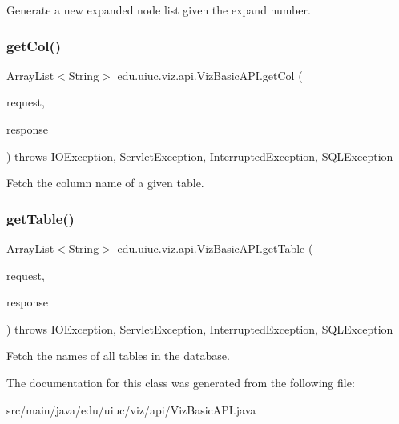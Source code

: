 Generate a new expanded node list given the expand number. \mbox{\label{classedu_1_1uiuc_1_1viz_1_1api_1_1_viz_basic_a_p_i_a0c2d23536f9202494daf32510029812e}} 
\subsubsection{\texorpdfstring{getCol()}{getCol()}}
{\footnotesize\ttfamily Array\+List$<$String$>$ edu.\+uiuc.\+viz.\+api.\+Viz\+Basic\+A\+P\+I.\+get\+Col (\begin{DoxyParamCaption}\item[{Http\+Servlet\+Request}]{request,  }\item[{Http\+Servlet\+Response}]{response }\end{DoxyParamCaption}) throws I\+O\+Exception, Servlet\+Exception, Interrupted\+Exception, S\+Q\+L\+Exception}

Fetch the column name of a given table. \mbox{\label{classedu_1_1uiuc_1_1viz_1_1api_1_1_viz_basic_a_p_i_a500d3fe640725e0463a129461c8941d2}} 
\subsubsection{\texorpdfstring{getTable()}{getTable()}}
{\footnotesize\ttfamily Array\+List$<$String$>$ edu.\+uiuc.\+viz.\+api.\+Viz\+Basic\+A\+P\+I.\+get\+Table (\begin{DoxyParamCaption}\item[{Http\+Servlet\+Request}]{request,  }\item[{Http\+Servlet\+Response}]{response }\end{DoxyParamCaption}) throws I\+O\+Exception, Servlet\+Exception, Interrupted\+Exception, S\+Q\+L\+Exception}

Fetch the names of all tables in the database. 

The documentation for this class was generated from the following file\+:\begin{DoxyCompactItemize}
\item 
src/main/java/edu/uiuc/viz/api/Viz\+Basic\+A\+P\+I.\+java\end{DoxyCompactItemize}
